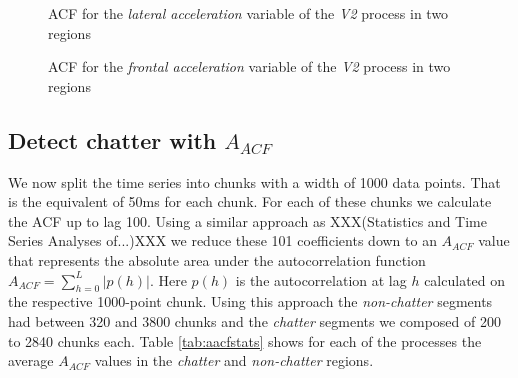 \documentclass[12 pt]{scrartcl}
\begin{document}
\begin{figure}[p]
  \caption{ACF for the \emph{lateral acceleration} variable of the \emph{V2} process in two regions}
  \label{fig:v2-lateral-acfs}
\end{figure}


\begin{figure}[p]
  \caption{ACF for the \emph{frontal acceleration} variable of the \emph{V2} process in two regions}
  \label{fig:v2-frontal-acfs}
\end{figure}

\subsection{Detect chatter with $A_{ACF}$}

We now split the time series into chunks with a width of 1000 data points. That is the equivalent of 50ms for each chunk. For each of these chunks we calculate the ACF up to lag 100.
Using a similar approach as XXX(Statistics and Time Series Analyses of...)XXX we reduce these 101 coefficients down to an $A_{ACF}$ value that represents the absolute area under the autocorrelation function $A_{ACF} = \sum^{L}_{h=0}{|p(h)|}$.
Here $p(h)$ is the autocorrelation at lag $h$ calculated on the respective 1000-point chunk. Using this approach the \emph{non-chatter} segments had between 320 and 3800 chunks and the \emph{chatter} segments we composed of 200 to 2840 chunks each. Table \ref{tab:aacfstats} shows for each of the processes the average $A_{ACF}$ values in the \emph{chatter} and \emph{non-chatter} regions.
\end{document}
